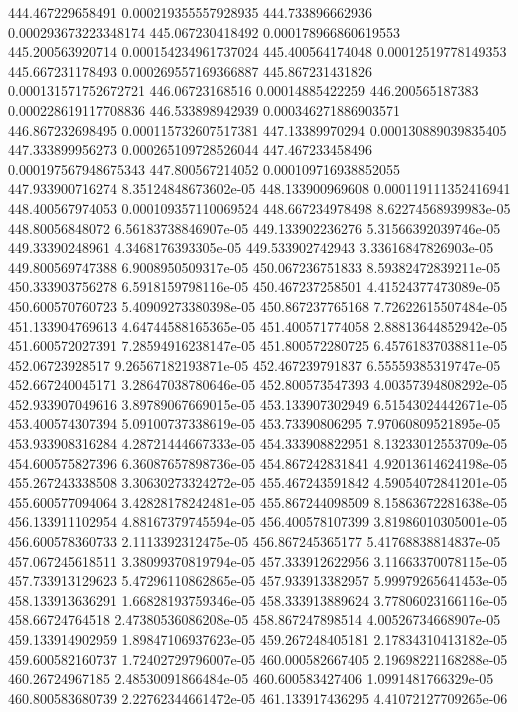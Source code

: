 {444.467229658491 0.000219355557928935
444.733896662936 0.000293673223348174
445.067230418492 0.000178966860619553
445.200563920714 0.000154234961737024
445.400564174048 0.00012519778149353
445.667231178493 0.000269557169366887
445.867231431826 0.000131571752672721
446.06723168516 0.00014885422259
446.200565187383 0.000228619117708836
446.533898942939 0.000346271886903571
446.867232698495 0.000115732607517381
447.13389970294 0.000130889039835405
447.333899956273 0.000265109728526044
447.467233458496 0.000197567948675343
447.800567214052 0.000109716938852055
447.933900716274 8.35124848673602e-05
448.133900969608 0.000119111352416941
448.400567974053 0.000109357110069524
448.667234978498 8.62274568939983e-05
448.80056848072 6.56183738846907e-05
449.133902236276 5.31566392039746e-05
449.33390248961 4.3468176393305e-05
449.533902742943 3.33616847826903e-05
449.800569747388 6.9008950509317e-05
450.067236751833 8.59382472839211e-05
450.333903756278 6.5918159798116e-05
450.467237258501 4.41524377473089e-05
450.600570760723 5.40909273380398e-05
450.867237765168 7.72622615507484e-05
451.133904769613 4.64744588165365e-05
451.400571774058 2.88813644852942e-05
451.600572027391 7.28594916238147e-05
451.800572280725 6.45761837038811e-05
452.06723928517 9.26567182193871e-05
452.467239791837 6.55559385319747e-05
452.667240045171 3.28647038780646e-05
452.800573547393 4.00357394808292e-05
452.933907049616 3.89789067669015e-05
453.133907302949 6.51543024442671e-05
453.400574307394 5.09100737338619e-05
453.73390806295 7.97060809521895e-05
453.933908316284 4.28721444667333e-05
454.333908822951 8.13233012553709e-05
454.600575827396 6.36087657898736e-05
454.867242831841 4.92013614624198e-05
455.267243338508 3.30630273324272e-05
455.467243591842 4.59054072841201e-05
455.600577094064 3.42828178242481e-05
455.867244098509 8.15863672281638e-05
456.133911102954 4.88167379745594e-05
456.400578107399 3.81986010305001e-05
456.600578360733 2.1113392312475e-05
456.867245365177 5.41768838814837e-05
457.067245618511 3.38099370819794e-05
457.333912622956 3.11663370078115e-05
457.733913129623 5.47296110862865e-05
457.933913382957 5.99979265641453e-05
458.133913636291 1.66828193759346e-05
458.333913889624 3.77806023166116e-05
458.66724764518 2.47380536086208e-05
458.867247898514 4.00526734668907e-05
459.133914902959 1.89847106937623e-05
459.267248405181 2.17834310413182e-05
459.600582160737 1.72402729796007e-05
460.000582667405 2.19698221168288e-05
460.26724967185 2.48530091866484e-05
460.600583427406 1.0991481766329e-05
460.800583680739 2.22762344661472e-05
461.133917436295 4.41072127709265e-06
}
